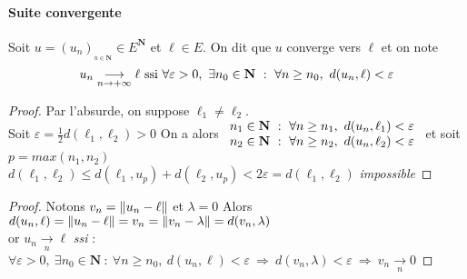 		\paragraph{Suite convergente}	
			Soit $u=\left( u_n\right)_{_{n\in\mathbf{N}}} \in E^{\mathbf{N}}$ et $\ell\in E$.
			On dit que $u$ converge vers $\ell$ et on note 
			\[
				u_n \underset{n\rightarrow +\infty}{\longrightarrow} \ell ~\mathrm{ssi}~\forall 
				\varepsilon >0 ,~\exists n_0 \in \mathbf{N} ~:~ \forall n\geq n_0,~d(u_n ,\ell) <\varepsilon
			\vspace{-25pt}
			\] 
		\trait 
			
			
		\begin{proof}
			Par l'absurde, on suppose $\ell_1\neq \ell_2$.\\
			Soit $\varepsilon = \frac{1}{2} d(\ell_1,\ell_2) >0$
			On a alors $\begin{array}{l} n_1 \in \mathbf{N} ~:~\forall n\geq n_1 ,~d(u_n,\ell_1) < \varepsilon \\  
			n_2 \in \mathbf{N} ~:~\forall n\geq n_2 ,~d(u_n,\ell_2) < \varepsilon \end{array} $  et soit $p=max(n_1,n_2)$ \vspace*{0.1cm}\\
			$d(\ell_1,\ell_2) \leq d(\ell_1,u_p) + d(\ell_2,u_p) < 2\varepsilon = d(\ell_1,\ell_2)$  \emph{impossible}
		\end{proof} \medskip
		
		
		\begin{proof}
			Notons $v_n = \left\Vert u_n-\ell \right\Vert$ et $\lambda = 0$
			Alors $d(u_n,\ell) = \left\Vert u_n - \ell \right\Vert = v_n = \left\Vert v_n - \lambda \right\Vert = d(v_n,\lambda )$ \\
			or $u_n \underset{n}{\rightarrow} \ell$ \emph{ssi} : $\forall \varepsilon >0 ,~\exists n_0 \in \mathbf{N} ~:~ 
			\forall n\geq n_0,~d(u_n ,\ell) <\varepsilon ~\Rightarrow ~ d(v_n,\lambda)<\varepsilon ~\Rightarrow ~ v_n \underset{n}{\rightarrow} 0$
		\end{proof} \medskip

